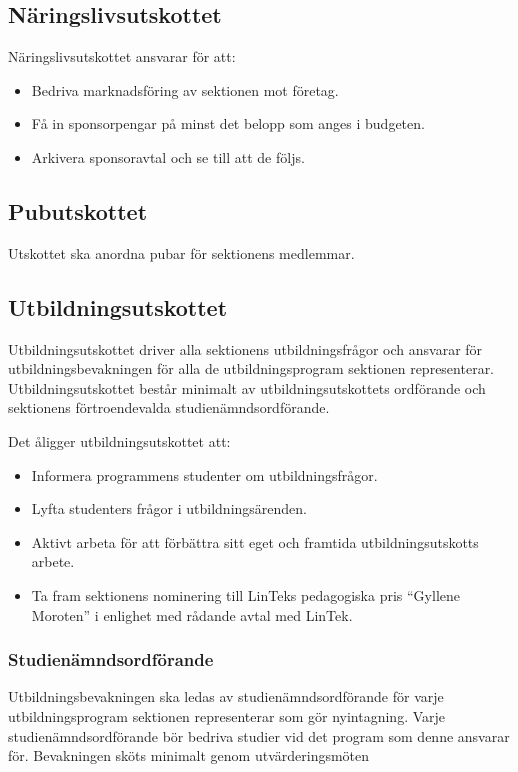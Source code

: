 \documentclass{datateknologsektionen-document}
\begin{document}
\subsection{Näringslivsutskottet}
Näringslivsutskottet ansvarar för att:
\begin{itemize}
  \item Bedriva marknadsföring av sektionen mot företag.
  \item Få in sponsorpengar på minst det belopp som anges i budgeten.
  \item Arkivera sponsoravtal och se till att de följs.
\end{itemize}

\subsection{Pubutskottet}
Utskottet ska anordna pubar för sektionens medlemmar.

\subsection{Utbildningsutskottet}
Utbildningsutskottet driver alla sektionens utbildningsfrågor och ansvarar för
utbildningsbevakningen för alla de utbildningsprogram sektionen representerar.
Utbildningsutskottet består minimalt av utbildningsutskottets ordförande och
sektionens förtroendevalda studienämndsordförande.

Det åligger utbildningsutskottet att:
\begin{itemize}
  \item Informera programmens studenter om utbildningsfrågor.
  \item Lyfta studenters frågor i utbildningsärenden.
  \item Aktivt arbeta för att förbättra sitt eget och framtida utbildningsutskotts arbete.
  \item Ta fram sektionens nominering till LinTeks pedagogiska pris ``Gyllene Moroten'' i enlighet med rådande avtal med LinTek.
\end{itemize}

\subsubsection{Studienämndsordförande}
Utbildningsbevakningen ska ledas av studienämndsordförande för varje utbildningsprogram
sektionen representerar som gör nyintagning. Varje studienämndsordförande bör bedriva
studier vid det program som denne ansvarar för. Bevakningen sköts minimalt genom utvärderingsmöten
\end{document}
